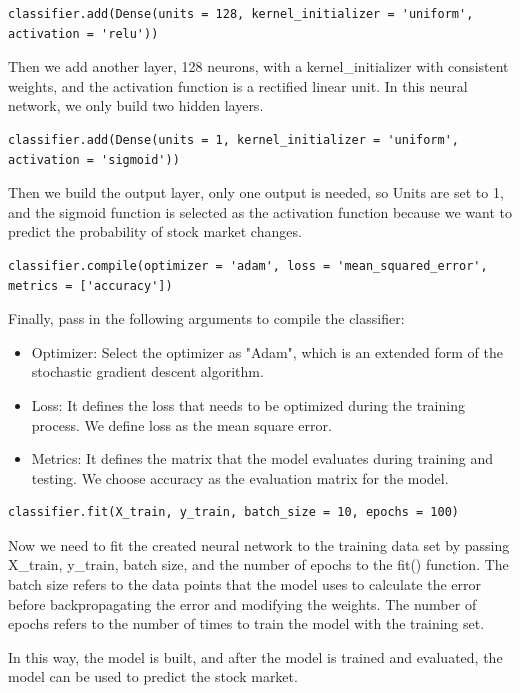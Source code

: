 \documentclass{article}
\begin{document}
\begin{verbatim}
classifier.add(Dense(units = 128, kernel_initializer = 'uniform', activation = 'relu'))
\end{verbatim}
Then we add another layer, 128 neurons, with a kernel\_initializer with consistent weights, and the activation function is a rectified linear unit. In this neural network, we only build two hidden layers.
\begin{verbatim}
classifier.add(Dense(units = 1, kernel_initializer = 'uniform', activation = 'sigmoid'))
\end{verbatim}
Then we build the output layer, only one output is needed, so Units are set to 1, and the sigmoid function is selected as the activation function because we want to predict the probability of stock market changes.
\begin{verbatim}
classifier.compile(optimizer = 'adam', loss = 'mean_squared_error', 
metrics = ['accuracy'])
\end{verbatim}
Finally, pass in the following arguments to compile the classifier:
\begin{itemize}
    \item Optimizer: Select the optimizer as "Adam", which is an extended form of the stochastic gradient descent algorithm.
    \item Loss: It defines the loss that needs to be optimized during the training process. We define loss as the mean square error.
    \item Metrics: It defines the matrix that the model evaluates during training and testing. We choose accuracy as the evaluation matrix for the model.
\end{itemize}
\begin{verbatim}
classifier.fit(X_train, y_train, batch_size = 10, epochs = 100)
\end{verbatim}
Now we need to fit the created neural network to the training data set by passing X\_train, y\_train, batch size, and the number of epochs to the fit() function. The batch size refers to the data points that the model uses to calculate the error before backpropagating the error and modifying the weights. The number of epochs refers to the number of times to train the model with the training set.

In this way, the model is built, and after the model is trained and evaluated, the model can be used to predict the stock market.
\end{document}
